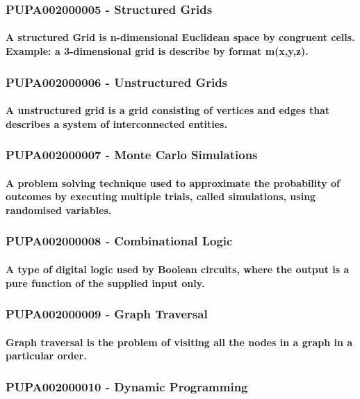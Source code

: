 \documentclass{acm_proc_article-sp}
\begin{document}
\subsubsection{PUPA002000005 - Structured Grids}
\paragraph{A structured Grid is n-dimensional Euclidean space by congruent cells. Example: a 3-dimensional grid is describe by format m(x,y,z).}
\subsubsection{PUPA002000006 - Unstructured Grids}
\paragraph{A unstructured grid is a grid consisting of vertices and edges that describes a system of interconnected entities.}
\subsubsection{PUPA002000007 - Monte Carlo Simulations}
\paragraph{A problem solving technique used to approximate the probability of outcomes by executing multiple trials, called simulations, using randomised variables.}
\subsubsection{PUPA002000008 - Combinational Logic}
\paragraph{A type of digital logic used by Boolean circuits, where the output is a pure function of the supplied input only.}
\subsubsection{PUPA002000009 - Graph Traversal}
\paragraph{Graph traversal is the problem of visiting all the nodes in a graph in a particular order.}
\subsubsection{PUPA002000010 - Dynamic Programming}
\end{document}
